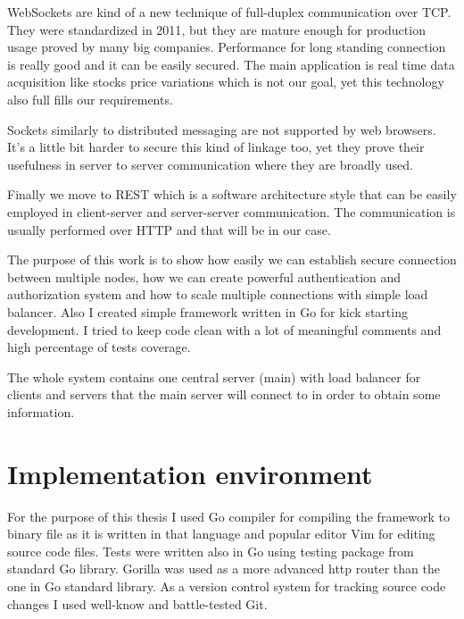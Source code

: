 WebSockets are kind of a new technique of full-duplex communication over TCP\@. They were standardized in 2011\cite{WebSockets-wiki}, but they are mature enough for production usage proved by many big companies. Performance for long standing connection is really good and it can be easily secured. The main application is real time data acquisition like stocks price variations which is not our goal, yet this technology also full fills our requirements.

Sockets similarly to distributed messaging are not supported by web browsers. It's a little bit harder to secure this kind of linkage too, yet they prove their usefulness in server to server communication where they are broadly used.

Finally we move to REST which is a software architecture style that can be easily employed in client-server and server-server communication. The communication is usually performed over HTTP and that will be in our case.

The purpose of this work is to show how easily we can establish secure connection between multiple nodes, how we can create powerful authentication and authorization system and how to scale multiple connections with simple load balancer. Also I created simple framework written in Go for kick starting development. I tried to keep code clean with a lot of meaningful comments and high percentage of tests coverage.

The whole system contains one central server (main) with load balancer for clients and servers that the main server will connect to in order to obtain some information.

\section{Implementation environment}
For the purpose of this thesis I used Go compiler for compiling the framework to binary file as it is written in that language and popular editor Vim for editing source code files. Tests were written also in Go using testing package from standard Go library. Gorilla was used as a more advanced http router than the one in Go standard library. As a version control system for tracking source code changes I used well-know and battle-tested Git.
